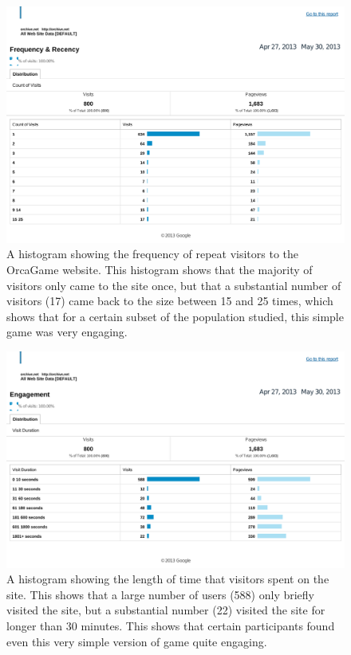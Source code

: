 \begin{figure}[h]
\centering
\includegraphics[width=\columnwidth]{figures/orcagameGoogleAnalyticsFrequency}
\caption{A histogram showing the frequency of repeat visitors to the
  OrcaGame website.  This histogram shows that the majority of
  visitors only came to the site once, but that a substantial number
  of visitors (17) came back to the size between 15 and 25 times,
  which shows that for a certain subset of the population studied,
  this simple game was very engaging.}
\label{fig:OrcaGameGoogleAnalyticsFrequency}
\end{figure}


\begin{figure}[h]
\centering
\includegraphics[width=\columnwidth]{figures/orcagameGoogleAnalyticsEngagement}
\caption{A histogram showing the length of time that visitors spent on
  the site.  This shows that a large number of users (588) only
  briefly visited the site, but a substantial number (22) visited the
  site for longer than 30 minutes.  This shows that certain
  participants found even this very simple version of game quite
  engaging. }
\label{fig:OrcaGameGoogleAnalyticsEngagement}
\end{figure}

